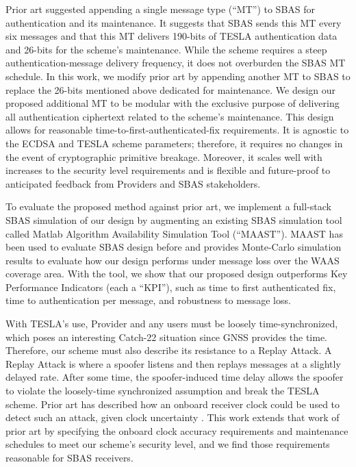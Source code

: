 \documentclass[letterpaper,times]{IONconf/IONconf}
\begin{document}
Prior art suggested appending a single message type (``MT'') to SBAS for authentication and its maintenance\cite{Neish_Dissertation}.
It suggests that SBAS sends this MT every six messages and that this MT delivers 190-bits of TESLA authentication data and 26-bits for the scheme's maintenance.
While the scheme requires a steep authentication-message delivery frequency, it does not overburden the SBAS MT schedule.
In this work, we modify prior art by appending another MT to SBAS to replace the 26-bits mentioned above dedicated for maintenance.
We design our proposed additional MT to be modular with the exclusive purpose of delivering all authentication ciphertext related to the scheme's maintenance.
This design allows for reasonable time-to-first-authenticated-fix requirements.
It is agnostic to the ECDSA and TESLA scheme parameters; therefore, it requires no changes in the event of cryptographic primitive breakage.
Moreover, it scales well with increases to the security level requirements and is flexible and future-proof to anticipated feedback from Providers and SBAS stakeholders.

To evaluate the proposed method against prior art, we implement a full-stack SBAS simulation of our design by augmenting an existing SBAS simulation tool called Matlab Algorithm Availability Simulation Tool (``MAAST'')\cite{MAAST}.
MAAST has been used to evaluate SBAS design before and provides Monte-Carlo simulation results to evaluate how our design performs under message loss over the WAAS coverage area.
With the tool, we show that our proposed design outperforms Key Performance Indicators (each a ``KPI''), such as time to first authenticated fix, time to authentication per message, and robustness to message loss.

With TESLA's use, Provider and any users must be loosely time-synchronized, which poses an interesting Catch-22 situation since GNSS provides the time.
Therefore, our scheme must also describe its resistance to a Replay Attack.
A Replay Attack is where a spoofer listens and then replays messages at a slightly delayed rate.
After some time, the spoofer-induced time delay allows the spoofer to violate the loosely-time synchronized assumption and break the TESLA scheme.
Prior art has described how an onboard receiver clock could be used to detect such an attack, given clock uncertainty \cite{time_sync_paper}.
This work extends that work of prior art by specifying the onboard clock accuracy requirements and maintenance schedules to meet our scheme's security level, and we find those requirements reasonable for SBAS receivers.
\end{document}
